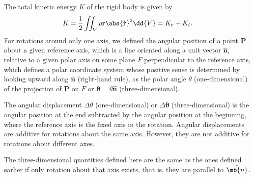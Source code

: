 \documentclass[a4paper,12pt]{article}
\begin{document}
The total kinetic energy $K$ of the rigid body is given by
\[K=\frac{1}{2}\iint_V\rho{\mathbf{r}}\abs{\dot{\mathbf{r}}}^2\dd{V}=K_r+K_t.\]
For rotations around only one axis, we defined the angular position of a point $\mathbf{P}$ about a given reference axis, which is a line oriented along a unit vector $\hat{\mathbf{n}}$, relative to a given polar axis on some plane $F$ perpendicular to the reference axis, which defines a polar coordinate system whose positive sense is determined by looking upward along $\hat{\mathbf{n}}$ (right-hand rule), as the polar angle $\theta$ (one-dimensional) of the projection of $\mathbf{P}$ on $F$ or $\boldsymbol{\theta}=\theta\hat{\mathbf{n}}$ (three-dimensional).

The angular displacement $\Delta\theta$ (one-dimensional) or $\Delta\boldsymbol{\theta}$ (three-dimensional) is the angular position at the end subtracted by the angular position at the beginning, where the reference axis is the fixed axis in the rotation. Angular displacements are additive for rotations about the same axis. However, they are not additive for rotations about different axes.

The three-dimensional quantities defined here are the same as the ones defined earlier if only rotation about that axis exists, that is, they are parallel to $\hat{\mb{n}}$.
\end{document}
